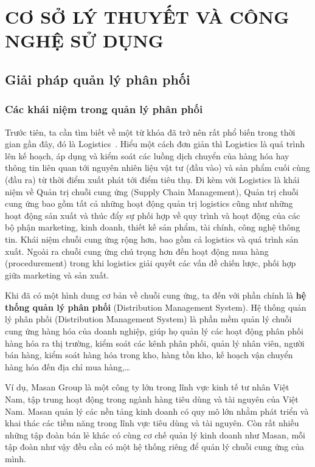 \chapter{CƠ SỞ LÝ THUYẾT VÀ CÔNG NGHỆ SỬ DỤNG}

\section{Giải pháp quản lý phân phối}
\subsection{Các khái niệm trong quản lý phân phối}
Trước tiên, ta cần tìm biết về một từ khóa đã trở nên rất
phổ biến trong thời gian gần đây,
đó là Logistics~\cite{logistics:online}. Hiểu một cách đơn
giản thì Logistics là quá trình lên kế hoạch, áp dụng và kiểm soát
các luồng dịch chuyển của hàng hóa hay thông tin liên quan tới nguyên
nhiên liệu vật tư (đầu vào) và sản phẩm cuối cùng (đầu ra) từ thời
điểm xuất phát tới điểm tiêu thụ. Đi kèm với Logistics là khái niệm
về Quản trị chuỗi cung ứng (Supply Chain Management), Quản trị chuỗi
cung ứng bao gồm tất cả những hoạt động quản trị logistics cũng như
những hoạt động sản xuất và thúc đẩy sự phối hợp về quy trình và
hoạt động của các bộ phận marketing, kinh doanh, thiết kế sản phẩm,
tài chính, công nghệ thông tin. Khái niệm chuỗi cung ứng rộng hơn,
bao gồm cả logistics và quá trình sản xuất. Ngoài ra chuỗi cung ứng
chú trọng hơn đến hoạt động mua hàng (procedurement) trong khi
logistics giải quyết các vấn đề chiến lược, phối hợp giữa marketing và
sản xuất.

Khi đã có một hình dung cơ bản về chuỗi cung ứng, ta đến với
phần chính là \textbf{hệ thống quản lý phân phối}
(Distribution Management System). Hệ thống quản lý phân phối
(Distribution Management System) là phần mềm quản lý chuỗi
cung ứng hàng hóa của doanh nghiệp, giúp họ quản lý các hoạt
động phân phối hàng hóa ra thị trường, kiểm soát các kênh phân
phối, quản lý nhân viên, người bán hàng, kiểm soát hàng hóa
trong kho, hàng tồn kho, kế hoạch vận chuyển
hàng hóa đến địa chỉ mua hàng,…

Ví dụ, Masan Group là một công ty lớn trong lĩnh vực kinh tế
tư nhân Việt Nam, tập trung hoạt động trong ngành hàng tiêu dùng và
tài nguyên của Việt Nam. Masan quản lý các nền tảng kinh doanh có
quy mô lớn nhằm phát triển và khai thác các tiềm năng trong lĩnh vực
tiêu dùng và tài nguyên. Còn rất nhiều những tập đoàn bán lẻ khác
có cùng cơ chế quản lý kinh doanh như Masan, mỗi tập đoàn như vậy đều
cần có một hệ thống riêng để quản lý chuỗi cung ứng của mình.

